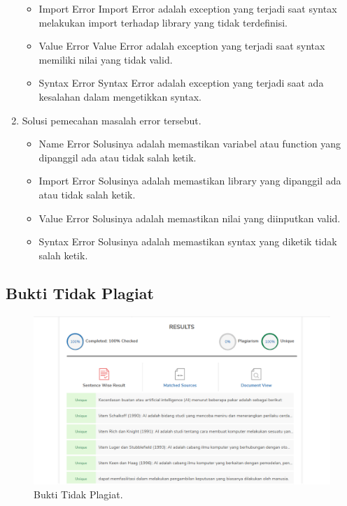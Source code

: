 \begin{enumerate}
\begin{itemize}
		\item Import Error
		\hfill\break
		Import Error adalah exception yang terjadi saat syntax melakukan import terhadap library yang tidak terdefinisi.
		\item Value Error
		\hfill\break
		Value Error adalah exception yang terjadi saat syntax memiliki nilai yang tidak valid.
		\item Syntax Error
		\hfill\break
		Syntax Error adalah exception yang terjadi saat ada kesalahan dalam mengetikkan syntax.
	\end{itemize}
	\item Solusi pemecahan masalah error tersebut.
	\begin{itemize}
		\item Name Error
		\hfill\break
		Solusinya adalah memastikan variabel atau function yang dipanggil ada atau tidak salah ketik.
		\item Import Error
		\hfill\break
		Solusinya adalah memastikan library yang dipanggil ada atau tidak salah ketik.
		\item Value Error
		\hfill\break
		Solusinya adalah memastikan nilai yang diinputkan valid.
		\item Syntax Error
		\hfill\break
		Solusinya adalah memastikan syntax yang diketik tidak salah ketik.
	\end{itemize}
\end{enumerate}

\subsection{Bukti Tidak Plagiat}
\begin{figure}[H]
	\includegraphics[width=8 cm]{figures/1174017/chapter1/plagiat.png}
	\centering
	\caption{Bukti Tidak Plagiat.}
\end{figure}